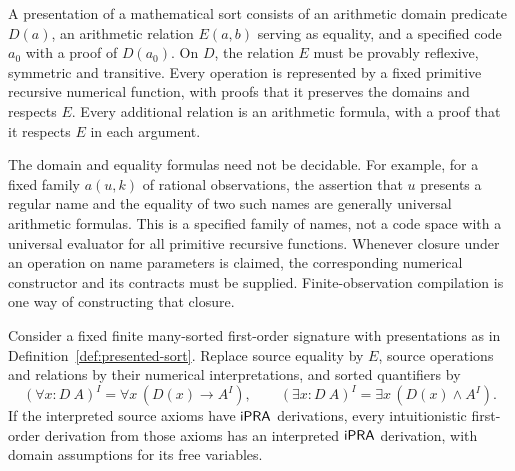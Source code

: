 \begin{definition}
\label{def:presented-sort}
A presentation of a mathematical sort consists of an arithmetic domain
predicate \(D(a)\), an arithmetic relation \(E(a,b)\) serving as equality,
and a specified code \(a_0\) with a proof of \(D(a_0)\). On \(D\), the
relation \(E\) must be provably reflexive, symmetric and transitive.
Every operation is represented by a fixed primitive recursive numerical
function, with proofs that it preserves the domains and respects \(E\).
Every additional relation is an arithmetic formula, with a proof that it
respects \(E\) in each argument.
\end{definition}

The domain and equality formulas need not be decidable. For example, for a
fixed family \(a(u,k)\) of rational observations, the assertion that \(u\)
presents a regular name and the equality of two such names are generally
universal arithmetic formulas. This is a specified family of names, not a
code space with a universal evaluator for all primitive recursive functions.
Whenever closure under an operation on name parameters is claimed, the
corresponding numerical constructor and its contracts must be supplied.
Finite-observation compilation is one way of constructing that closure.

\begin{proposition}
\label{prop:setoid-interpretation}
Consider a fixed finite many-sorted first-order signature with presentations
as in Definition~\ref{def:presented-sort}. Replace source equality by \(E\),
source operations and relations by their numerical interpretations, and
sorted quantifiers by
\[
 (\forall x{:}D\ A)^I=\forall x\,(D(x)\to A^I),
 \qquad
 (\exists x{:}D\ A)^I=\exists x\,(D(x)\land A^I).
\]
If the interpreted source axioms have \(\mathsf{iPRA}\) derivations, every
intuitionistic first-order derivation from those axioms has an interpreted
\(\mathsf{iPRA}\) derivation, with domain assumptions for its free variables.
\end{proposition}

